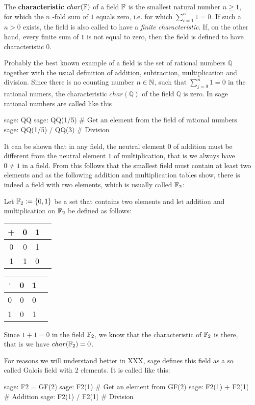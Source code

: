The \textbf{characteristic} $char(\mathbb{F})$ of a field $ \mathbb{F} $ is the smallest natural number $ n \geq 1 $, for which the $ n $ -fold sum of $ 1 $ equals zero, i.e. for which $ \sum_{i = 1} ^ n 1 = 0 $. If such a $ n> 0 $ exists, the field is also called to have a \textit{finite characteristic}. If, on the other hand, every finite sum of $1$ is not equal to zero, then the field is defined to have characteristic $ 0 $.
\begin{example} Probably the best known example of a field is the set of rational numbers $\mathbb{Q}$ together with the usual definition of addition, subtraction, multiplication and division. Since there is no counting number $n\in \mathbb{N}$, such that $\sum_{j=0}^n 1 =0$ in the rational numers, the characteristic $char(\mathbb{Q})$ of the field $\mathbb{Q}$ is zero. In sage rational numbers are called like this
\begin{sagecommandline}
sage: QQ
sage: QQ(1/5) # Get an element from the field of rational numbers
sage: QQ(1/5) / QQ(3) # Division
\end{sagecommandline}
\end{example}
\begin{example} It can be shown that in any field, the neutral element $0$ of addition must be different from the neutral element $1$ of multiplication, that is we always have $0\neq 1$ in a field. From this follows that the smallest field must contain at least two elements and as the following addition and multiplication tables show, there is indeed a field with two elements, which is usually called $\mathbb{F}_2$:

Let $\mathbb{F}_2:=\{0,1 \}$ be a set that contains two elements and let addition and multiplication on $\mathbb{F}_2$ be defined as follows:
\begin{center}
  \begin{tabular}{c | c c c}
    + & 0 & 1 \\\hline
    0 & 0 & 1\\
    1 & 1 & 0 \\
  \end{tabular} \quad \quad \quad \quad
  \begin{tabular}{c | c c c}
$\cdot$ & 0 & 1 \\\hline
      0 & 0 & 0 \\
      1 & 0 & 1 \\
  \end{tabular}
\end{center}
Since $1+1=0$ in the field $\mathbb{F}_2$, we know that the characteristic of $\mathbb{F}_2$ is there, that is we have $char(\mathbb{F}_2)=0$.

For reasons we will understand better in XXX, sage defines this field as a so called Galois field with 2 elements. It is called like this:
\begin{sagecommandline}
sage: F2 = GF(2)
sage: F2(1) # Get an element from GF(2)
sage: F2(1) + F2(1) # Addition
sage: F2(1) / F2(1) # Division
\end{sagecommandline}
\end{example}
